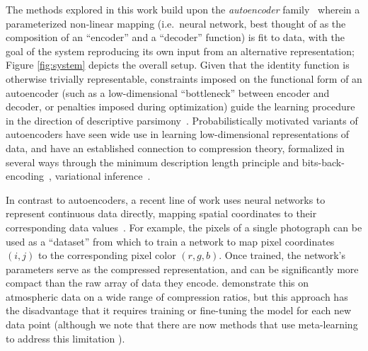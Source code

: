 \documentclass[11pt, a4paper, logo, copyright, numbering]{googledeepmind}
\begin{document}
The methods explored in this work build upon the \emph{autoencoder} family~\citep{ackley1985learning,hinton1990connectionist} wherein a parameterized non-linear mapping (i.e.\ neural network, best thought of as the composition of an ``encoder'' and a ``decoder'' function) is fit to data, with the goal of the system reproducing its own input from an alternative representation; Figure \ref{fig:system} depicts the overall setup.
Given that the identity function is otherwise trivially representable, constraints imposed on the functional form of an autoencoder (such as a low-dimensional ``bottleneck'' between encoder and decoder, or penalties imposed during optimization) guide the learning procedure in the direction of descriptive parsimony~\citep{elman1988learning,Cottrell1987}.
Probabilistically motivated variants of autoencoders have seen wide use in learning low-dimensional representations of data, and have an established connection to compression theory, formalized in several ways through the minimum description length principle and bits-back-encoding~\citep{hinton1993autoencoders, grunwald2007minimum}, variational inference~\citep{rezende2014reparameterizationtrick,kingma2014vae}.

In contrast to autoencoders, a recent line of work uses neural networks to represent continuous data directly, mapping spatial coordinates to their corresponding data values~\citep{dupont2022functa, xie2022neural_fields_beyond}. For example, the pixels of a single photograph can be used as a ``dataset'' from which to train a network to map pixel coordinates $(i, j)$ to the corresponding pixel color $(r, g, b)$. Once trained, the network's parameters serve as the compressed representation, and can be significantly more compact than the raw array of data they encode.
\citet{huang2022compressing} demonstrate this on atmospheric data on a wide range of compression ratios, but this approach has the disadvantage that it requires training or fine-tuning the model for each new data point (although we note that there are now methods that use meta-learning to address this limitation \citep{coinplusplus_2022}).
\end{document}
